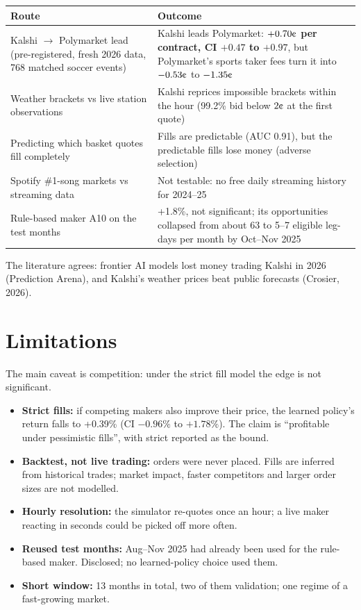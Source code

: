 \documentclass[11pt,a4paper]{article}
\newcommand{\cent}{\text{\textcent}}
\begin{document}
\begin{center}
\small
\begin{tabularx}{\textwidth}{>{\raggedright\arraybackslash}p{5.4cm} L}
\toprule
Route & Outcome \\
\midrule
Kalshi $\rightarrow$ Polymarket lead (pre-registered, fresh 2026 data, 768 matched soccer events)
  & Kalshi leads Polymarket: \textbf{\boldmath $+0.70\cent$ per contract, CI $+0.47$ to $+0.97$}, but Polymarket's sports taker
    fees turn it into $-0.53\cent$ to $-1.35\cent$ \\
Weather brackets vs live station observations
  & Kalshi reprices impossible brackets within the hour (99.2\% bid below $2\cent$ at the first quote) \\
Predicting which basket quotes fill completely
  & Fills are predictable (AUC 0.91), but the predictable fills lose money (adverse selection) \\
Spotify \#1-song markets vs streaming data
  & Not testable: no free daily streaming history for 2024--25 \\
Rule-based maker A10 on the test months
  & +1.8\%, not significant; its opportunities collapsed from about 63 to 5--7 eligible leg-days per month by
    Oct--Nov 2025 \\
\bottomrule
\end{tabularx}
\end{center}

\noindent The literature agrees: frontier AI models lost money trading Kalshi in 2026 (Prediction Arena), and
Kalshi's weather prices beat public forecasts (Crosier, 2026).

\section{Limitations}

The main caveat is competition: under the strict fill model the edge is not significant.

\begin{itemize}
  \item \textbf{Strict fills:} if competing makers also improve their price, the learned policy's return falls to
        +0.39\% (CI $-0.96\%$ to $+1.78\%$). The claim is ``profitable under pessimistic fills'', with strict reported
        as the bound.
  \item \textbf{Backtest, not live trading:} orders were never placed. Fills are inferred from historical trades;
        market impact, faster competitors and larger order sizes are not modelled.
  \item \textbf{Hourly resolution:} the simulator re-quotes once an hour; a live maker reacting in seconds could be
        picked off more often.
  \item \textbf{Reused test months:} Aug--Nov 2025 had already been used for the rule-based maker. Disclosed; no
        learned-policy choice used them.
  \item \textbf{Short window:} 13 months in total, two of them validation; one regime of a fast-growing market.
\end{itemize}
\end{document}
